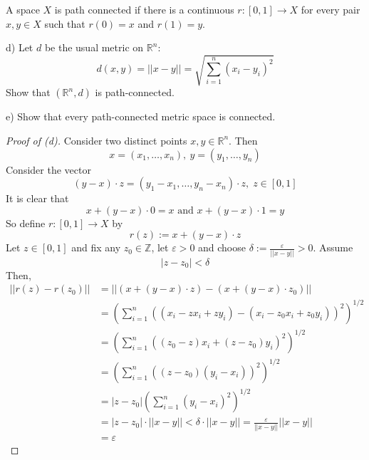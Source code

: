 \begin{prob}
    A space $X$ is path connected if there is a 
    continuous $r : [0,1] \to X$ for every pair $x,y \in X$
    such that $r(0) = x$ and $r(1) = y$.

    d) Let $d$ be the usual metric on $\mathbb R^n$: 
    \[
        d(x,y) = ||x-y|| = \sqrt{\displaystyle\sum_{i=1}^{n} 
        (x_i - y_i)^2}
    \]
    Show that $(\mathbb R^n, d)$ is path-connected. 

    e) Show that every path-connected metric space is connected.
\end{prob}
\begin{proof}[Proof of (d)]
    Consider two distinct points $x,y \in \mathbb R^n$. Then 
    \[
        x = (x_1,\ldots,x_n), \ y = (y_1,\ldots,y_n)
    \]
    Consider the vector 
    \[
        (y - x) \cdot z = (y_1 - x_1, \ldots, y_n - x_n) \cdot z, \; 
        z \in [0,1]
    \]
    It is clear that 
    \[
        x + (y-x) \cdot 0 = x \text{ and } x + (y - x) \cdot 1 = y  
    \]
    So define $r: [0,1] \to X$ by 
    \[
        r(z) := x + (y-x) \cdot z
    \]
    Let $z \in [0,1]$ and fix any $z_0 \in \mathbb Z$, 
    let $\varepsilon > 0$ and choose $\delta := 
    \frac{\varepsilon}{||x-y||}> 0$. 
    Assume
    \[
        |z - z_0| < \delta 
    \]
    Then, 
    \begin{align*}
        ||r(z) - r(z_0)|| 
        &= ||(x + (y-x) \cdot z) - (x + (y-x) \cdot z_0)|| \\ 
        &= \left(\displaystyle\sum_{i=1}^{n} 
        \left(
            (x_i - zx_i + zy_i) 
            - 
            (x_i - z_0x_i + z_0y_i)
        \right)^2
        \right)^{1/2} \\ 
        &= \left(\displaystyle\sum_{i=1}^{n} 
        \left(
            (z_0-z)x_i + (z - z_0)y_i
        \right)^2
        \right)^{1/2} \\ 
        &= \left(\displaystyle\sum_{i=1}^{n} 
        \left(
            (z - z_0)(y_i - x_i)
        \right)^2
        \right)^{1/2} \\ 
        &= |z - z_0| \left(\displaystyle\sum_{i=1}^{n} 
        \left(
            y_i - x_i
        \right)^2
        \right)^{1/2} \\ 
        &= |z-z_0| \cdot ||x - y||
        < \delta \cdot ||x-y|| = \frac{\varepsilon}{||x-y||}||x-y|| 
        \\ 
        &= \varepsilon
    \end{align*}
\end{proof}

